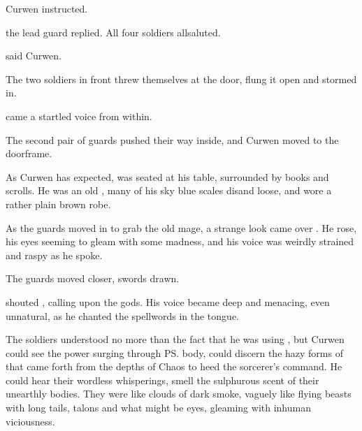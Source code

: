 \begin{comment}
\subsection{\Ambrose{} \Onatol{}}
\end{comment}

%
 Curwen instructed. 

 the lead guard replied. 
All four soldiers\dash \scathae{} all\dash saluted. 

 said Curwen. 

The two soldiers in front threw themselves at the door, flung it open and stormed in. 

 came a startled voice from within.

The second pair of guards pushed their way inside, and Curwen moved to the doorframe. 

As Curwen has expected, \Onatol{} was seated at his table, surrounded by books and scrolls. 
He was an old \dax{}, many of his sky blue scales dis\coloured and loose, and wore a rather plain brown robe. 


As the guards moved in to grab the old mage, a strange look came over \Onatol. He rose, his eyes seeming to gleam with some madness, and his voice was weirdly strained and raspy as he spoke. 

The guards moved closer, swords drawn.

 shouted \Onatol, calling upon the \Ortaican{} gods. 
His voice became deep and menacing, even unnatural, as he chanted the spellwords in the \Draconic{} tongue. 

The soldiers understood no more than the fact that he was using , but Curwen could see the \chaotic{} power surging through \ps{\Onatol}{} body, could discern the hazy forms of  that came forth from the depths of Chaos to heed the sorcerer's command.  
He could hear their wordless whisperings, smell the sulphurous scent of their unearthly bodies. 
They were like clouds of dark smoke, vaguely like flying beasts with long tails, talons and what might be eyes, gleaming with inhuman viciousness. 

